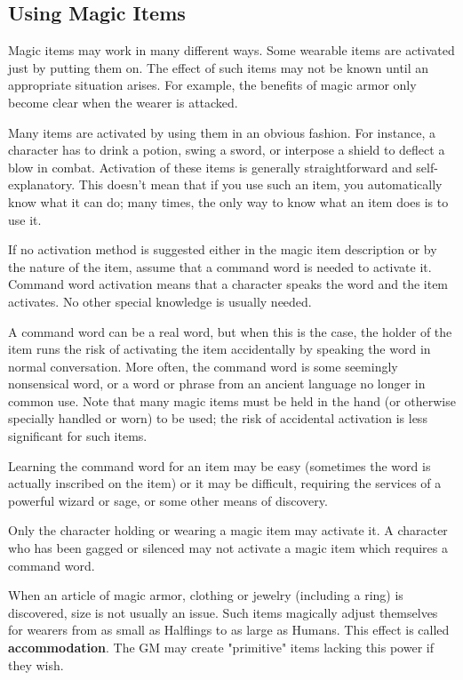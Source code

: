 \documentclass[a4paper,twoside,openany,10pt]{book}
\begin{document}
\begin{multicols}{2}
	
\subsection{Using Magic Items}\label{using-magic-items}

Magic items may work in many different ways. Some wearable items are activated just by putting them on. The effect of such items may not be known until an appropriate situation arises. For example, the benefits of magic armor only become clear when the wearer is attacked.

Many items are activated by using them in an obvious fashion. For instance, a character has to drink a potion, swing a sword, or interpose a shield to deflect a blow in combat. Activation of these items is generally straightforward and self-explanatory. This doesn't mean that if you use such an item, you automatically know what it can do; many times, the only way to know what an item does is to use it.

If no activation method is suggested either in the magic item description or by the nature of the item, assume that a command word is needed to activate it. Command word activation means that a character speaks the word and the item activates. No other special knowledge is usually needed.

A command word can be a real word, but when this is the case, the holder of the item runs the risk of activating the item accidentally by speaking the word in normal conversation. More often, the command word is some seemingly nonsensical word, or a word or phrase from an ancient language no longer in common use. Note that many magic items must be held in the hand (or otherwise specially handled or worn) to be used; the risk of accidental activation is less significant for such items.

Learning the command word for an item may be easy (sometimes the word is actually inscribed on the item) or it may be difficult, requiring the services of a powerful wizard or sage, or some other means of discovery. 

Only the character holding or wearing a magic item may activate it. A character who has been gagged or silenced may not activate a magic item which requires a command word.

When an article of magic armor, clothing or jewelry (including a ring) is discovered, size is not usually an issue. Such items magically adjust themselves for wearers from as small as Halflings to as large as Humans. This effect is called \textbf{accommodation}. The GM may create "primitive" items lacking this power if they wish. 


\end{multicols}
\end{document}
